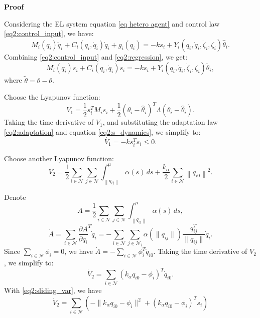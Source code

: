 \noindent\textbf{Proof}

Considering the EL system equation \eqref{eq hetero agent} and control law \eqref{eq2:control_input}, we have:
\begin{equation*}\label{eq2:EL_control}
	M_i(q_i)\ddot{q}_i+C_i(q_i,\dot{q}_i)\dot{q}_i+g_i(q_i)= -k s_i + Y_i(q_{i},\dot{q}_{i},\dot{\zeta}_i,\zeta_i) \hat{\theta}_i.
\end{equation*}
Combining \eqref{eq2:control_input} and \eqref{eq2:regression}, we get:
\begin{equation}\label{eq2:s_dynamics}
	M_i(q_i)\dot{s}_i+C_i(q_i,\dot{q}_i)s_i= -k s_i + Y_i(q_{i},\dot{q}_{i},\dot{\zeta}_i,\zeta_i) \tilde{\theta}_i,
\end{equation}
where \(\tilde{\theta}=\hat{\theta}-\theta\).

Choose the Lyapunov function:
\begin{equation*}\label{eq2:V1}
	V_1 = \frac{1}{2} s_i^T M_i s_i + \frac{1}{2} (\theta_i - \hat{\theta}_i)^T \Lambda (\theta_i - \hat{\theta}_i).
\end{equation*}
Taking the time derivative of \( V_1 \), and substituting the adaptation law \eqref{eq2:adaptation} and equation \eqref{eq2:s_dynamics}, we simplify to:
\begin{equation*}\label{eq2:V1_dot}
	\dot{V_1} = -k s_i^T s_i \leq 0.
\end{equation*}


Choose another Lyapunov function:
\begin{equation*}\label{eq2:V2}
	V_2 = \frac{1}{2} \sum_{i\in\mathcal{N}}\sum_{j\in\mathcal{N}}
	\int_{\left\| q_{ij} \right\|}^{\mu}
	\alpha(s)\,ds
	+ \frac{k_\alpha}{2}\sum_{i\in\mathcal{N}}
	\left\| q_{i0} \right\|^2.
\end{equation*}

Denote
\begin{equation*}\label{eq2:A}
	A=\frac{1}{2} \sum_{i\in\mathcal{N}}\sum_{j\in\mathcal{N}}
	\int_{\left\| q_{ij} \right\|}^{\mu}
	\alpha(s)\,ds,
\end{equation*}
\begin{equation}\label{eq2:A_dot}
	\dot{A} = \sum_{i\in\mathcal{N}} \frac{\partial A}{\partial q_i}^T \dot{q}_i
    	= -\sum_{i\in\mathcal{N}} \sum_{j\in\mathcal{N}_i} \alpha(\|q_{ij}\|)\frac{q_{ij}^T}{\|q_{ij}\|}\dot{q}_i.
\end{equation}
Since $\sum_{i\in\mathcal{N}}\phi_i = 0$, we have $\dot{A} = -\sum_{i\in\mathcal{N}} \phi_i^T \dot{q}_{i0}$.
Taking the time derivative of \( V_2 \), we simplify to:
\begin{equation*}\label{eq2:V2_dot_final}
	\dot{V}_2 =\sum_{i\in\mathcal{N}}(k_\alpha q_{i0}-\phi_i)^T\dot{q}_{i0}.
\end{equation*}
With \eqref{eq2:sliding_var}, we have
\[
\dot{V}_2=\sum_{i\in\mathcal{N}} \left(-\|k_\alpha q_{i0}-\phi_i\|^2
    +(k_\alpha q_{i0}-\phi_i)^T s_i
\right)
\]

